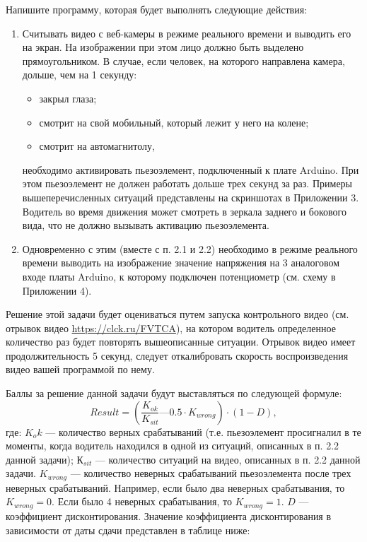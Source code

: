 
Напишите программу, которая будет выполнять следующие действия:

\begin{enumerate}
    \item Считывать видео с веб-камеры в режиме реального времени и выводить его на экран. На изображении при этом лицо должно быть выделено прямоугольником. 
    В случае, если человек, на которого направлена камера, дольше, чем на 1 секунду:
    \begin{itemize}
        \item закрыл глаза;
        \item смотрит на свой мобильный, который лежит у него на колене;
        \item смотрит на автомагнитолу,
    \end{itemize}
    необходимо активировать пьезоэлемент, подключенный к плате Arduino. При этом пьезоэлемент не должен работать дольше трех секунд за раз. Примеры вышеперечисленных ситуаций представлены на скриншотах в Приложении 3. Водитель во время движения может смотреть в зеркала заднего и бокового вида, что не должно вызывать активацию пьезоэлемента.
    \item Одновременно с этим (вместе с п. 2.1 и 2.2) необходимо в режиме реального времени выводить на изображение значение напряжения на 3 аналоговом входе платы Arduino, к которому подключен потенциометр (см. схему в Приложении 4).
\end{enumerate}

\markSection

Решение этой задачи будет оцениваться путем запуска контрольного видео (см. отрывок видео \url{https://clck.ru/FVTCA}), на котором водитель определенное количество раз будет повторять вышеописанные ситуации. Отрывок видео имеет продолжительность 5 секунд, следует откалибровать скорость воспроизведения видео вашей программой по нему.

Баллы за решение данной задачи будут выставляться по следующей формуле:
$$Result=(\frac{K_{ok}}{K_{sit}} — 0.5\cdot K_{wrong})\cdot (1 - D),$$
где: 
$K_ok$ — количество верных срабатываний (т.е. пьезоэлемент просигналил в те моменты, когда водитель находился в одной из ситуаций, описанных в п. 2.2 данной задачи);
$К_{sit}$ — количество ситуаций на видео, описанных в п. 2.2 данной задачи.
$K_{wrong}$ — количество неверных срабатываний пьезоэлемента после трех неверных срабатываний. Например, если было два неверных срабатывания, то $K_{wrong} = 0$. Если было 4 неверных срабатывания, то $K_{wrong} = 1$.
$D$ — коэффициент дисконтирования. Значение коэффициента дисконтирования в зависимости от даты сдачи представлен в таблице ниже:

